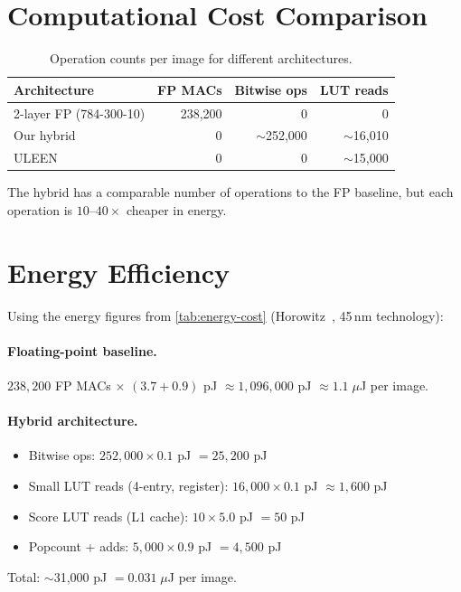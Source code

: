 \section{Computational Cost Comparison}
\label{sec:cost-comparison}

\begin{table}[htbp]
\centering
\caption{Operation counts per image for different architectures.}
\label{tab:op-counts}
\begin{tabular}{@{}lrrr@{}}
  \toprule
  \textbf{Architecture} & \textbf{FP MACs} & \textbf{Bitwise ops}
    & \textbf{LUT reads} \\
  \midrule
  2-layer FP (784-300-10) & 238,200 & 0 & 0 \\
  Our hybrid & 0 & $\sim$252,000 & $\sim$16,010 \\
  ULEEN~\cite{susskind2024uleen} & 0 & 0 & $\sim$15,000 \\
  \bottomrule
\end{tabular}
\end{table}

The hybrid has a comparable number of operations to the FP baseline,
but each operation is $10$--$40\times$ cheaper in energy.


\section{Energy Efficiency}
\label{sec:energy}

Using the energy figures from \cref{tab:energy-cost}
(Horowitz~\cite{horowitz2014energy}, 45\,nm technology):

\paragraph{Floating-point baseline.}
$238{,}200$ FP MACs $\times$ $(3.7 + 0.9)$ pJ
$\approx 1{,}096{,}000$ pJ $\approx 1.1 \; \mu$J per image.

\paragraph{Hybrid architecture.}
\begin{itemize}
  \item Bitwise ops: $252{,}000 \times 0.1$ pJ $= 25{,}200$ pJ
  \item Small LUT reads (4-entry, register): $16{,}000 \times 0.1$
    pJ $\approx 1{,}600$ pJ
  \item Score LUT reads (L1 cache): $10 \times 5.0$ pJ $= 50$ pJ
  \item Popcount + adds: $5{,}000 \times 0.9$ pJ $= 4{,}500$ pJ
\end{itemize}
Total: $\sim$31,000 pJ $= 0.031 \; \mu$J per image.

